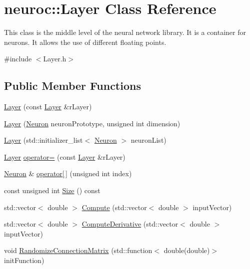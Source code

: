 \hypertarget{classneuroc_1_1_layer}{\section{neuroc\-:\-:Layer Class Reference}
\label{classneuroc_1_1_layer}
}


This class is the middle level of the neural network library. It is a container for neurons. It allows the use of different floating points.  




{\ttfamily \#include $<$Layer.\-h$>$}

\subsection*{Public Member Functions}
\begin{DoxyCompactItemize}
\item 
\hyperlink{classneuroc_1_1_layer_af6c8e29004e6da131d5b22e475c0e92a}{Layer} (const \hyperlink{classneuroc_1_1_layer}{Layer} \&r\-Layer)
\item 
\hyperlink{classneuroc_1_1_layer_a3be19d5c1aaabb35cba0e07b33913ba9}{Layer} (\hyperlink{classneuroc_1_1_neuron}{Neuron} neuron\-Prototype, unsigned int dimension)
\item 
\hyperlink{classneuroc_1_1_layer_ab033a91582f5f6b7db961d516d2e7f7e}{Layer} (std\-::initializer\-\_\-list$<$ \hyperlink{classneuroc_1_1_neuron}{Neuron} $>$ neuron\-List)
\item 
\hyperlink{classneuroc_1_1_layer}{Layer} \hyperlink{classneuroc_1_1_layer_aa198f0235496dadff15a8b80bfa564d6}{operator=} (const \hyperlink{classneuroc_1_1_layer}{Layer} \&r\-Layer)
\item 
\hyperlink{classneuroc_1_1_neuron}{Neuron} \& \hyperlink{classneuroc_1_1_layer_ae82161250ed86f8965d239449c87d734}{operator\mbox{[}$\,$\mbox{]}} (unsigned int index)
\item 
const unsigned int \hyperlink{classneuroc_1_1_layer_aa80735d22f8f35c5ec35e059677ab733}{Size} () const 
\item 
std\-::vector$<$ double $>$ \hyperlink{classneuroc_1_1_layer_a4d879665e9fd0738fea6a5200c70296a}{Compute} (std\-::vector$<$ double $>$ input\-Vector)
\item 
std\-::vector$<$ double $>$ \hyperlink{classneuroc_1_1_layer_afdb93accd5a1cd5bb7e611fe2048a890}{Compute\-Derivative} (std\-::vector$<$ double $>$ input\-Vector)
\item 
void \hyperlink{classneuroc_1_1_layer_ac00e3384d6e22bf87b4359c43cb4461e}{Randomize\-Connection\-Matrix} (std\-::function$<$ double(double)$>$ init\-Function)

\end{DoxyCompactItemize}

